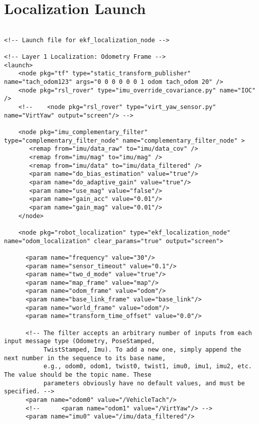 \section*{Localization Launch}
\begin{lstlisting}[breaklines=true,basicstyle=\tiny]

<!-- Launch file for ekf_localization_node -->

<!-- Layer 1 Localization: Odometry Frame -->
<launch>
    <node pkg="tf" type="static_transform_publisher" name="tach_odom123" args="0 0 0 0 0 0 1 odom tach_odom 20" />
    <node pkg="rsl_rover" type="imu_override_covariance.py" name="IOC" />
    <!--    <node pkg="rsl_rover" type="virt_yaw_sensor.py" name="VirtYaw" output="screen"/> -->

    <node pkg="imu_complementary_filter" type="complementary_filter_node" name="complementary_filter_node" >
	   <remap from="imu/data_raw" to="imu/data_cov" />
	   <remap from="imu/mag" to="imu/mag" />
	   <remap from="imu/data" to="imu/data_filtered" />
	   <param name="do_bias_estimation" value="true"/>
	   <param name="do_adaptive_gain" value="true"/>
	   <param name="use_mag" value="false"/>
	   <param name="gain_acc" value="0.01"/>
	   <param name="gain_mag" value="0.01"/>
    </node>

    <node pkg="robot_localization" type="ekf_localization_node" name="odom_localization" clear_params="true" output="screen">

      <param name="frequency" value="30"/>
      <param name="sensor_timeout" value="0.1"/>
      <param name="two_d_mode" value="true"/>
      <param name="map_frame" value="map"/>
      <param name="odom_frame" value="odom"/>
      <param name="base_link_frame" value="base_link"/>
      <param name="world_frame" value="odom"/>
      <param name="transform_time_offset" value="0.0"/>

      <!-- The filter accepts an arbitrary number of inputs from each input message type (Odometry, PoseStamped,
           TwistStamped, Imu). To add a new one, simply append the next number in the sequence to its base name,
           e.g., odom0, odom1, twist0, twist1, imu0, imu1, imu2, etc. The value should be the topic name. These
           parameters obviously have no default values, and must be specified. -->
      <param name="odom0" value="/VehicleTach"/>
      <!--      <param name="odom1" value="/VirtYaw"/> -->
      <param name="imu0" value="/imu/data_filtered"/>


\end{lstlisting}
